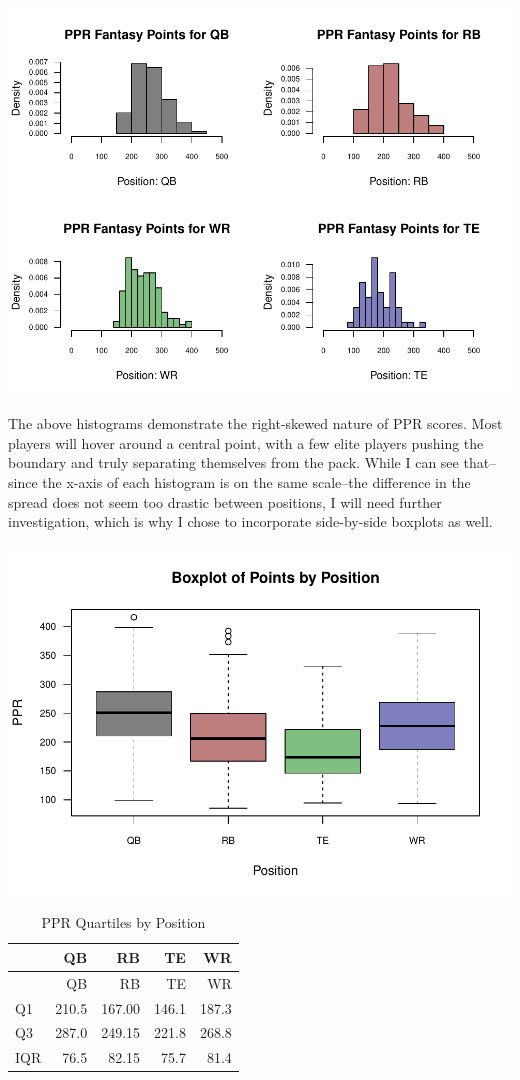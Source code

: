 \documentclass[
]{article}
\begin{document}
\begin{center}\includegraphics[width=0.85\linewidth]{stats_199_final_report_files/figure-latex/unnamed-chunk-1-1} \end{center}

The above histograms demonstrate the right-skewed nature of PPR scores.
Most players will hover around a central point, with a few elite players
pushing the boundary and truly separating themselves from the pack.
While I can see that--since the x-axis of each histogram is on the same
scale--the difference in the spread does not seem too drastic between
positions, I will need further investigation, which is why I chose to
incorporate side-by-side boxplots as well.

\begin{center}\includegraphics[width=0.85\linewidth]{stats_199_final_report_files/figure-latex/unnamed-chunk-2-1} \end{center}

\begin{longtable}[]{@{}lrrrr@{}}
\caption{PPR Quartiles by Position}\tabularnewline
\toprule
& QB & RB & TE & WR \\
\midrule
\endfirsthead
\toprule
& QB & RB & TE & WR \\
\midrule
\endhead
Q1 & 210.5 & 167.00 & 146.1 & 187.3 \\
Q3 & 287.0 & 249.15 & 221.8 & 268.8 \\
IQR & 76.5 & 82.15 & 75.7 & 81.4 \\
\bottomrule
\end{longtable}
\end{document}
